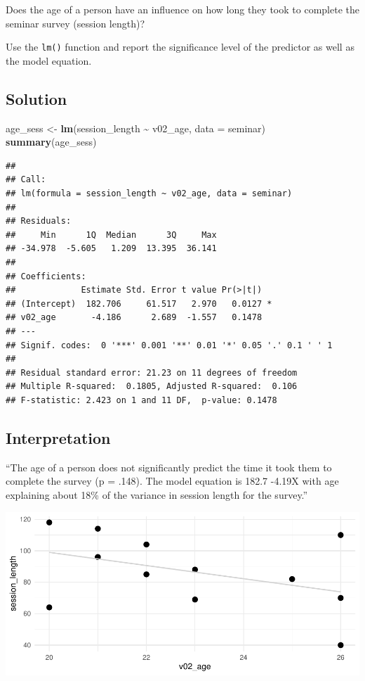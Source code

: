 \documentclass[
]{book}
\newenvironment{Shaded}{\begin{snugshade}}{\end{snugshade}}
\newcommand{\AttributeTok}[1]{\textcolor[rgb]{0.13,0.29,0.53}{#1}}
\newcommand{\FunctionTok}[1]{\textcolor[rgb]{0.13,0.29,0.53}{\textbf{#1}}}
\newcommand{\NormalTok}[1]{#1}
\newcommand{\OtherTok}[1]{\textcolor[rgb]{0.56,0.35,0.01}{#1}}
\newcommand{\SpecialCharTok}[1]{\textcolor[rgb]{0.81,0.36,0.00}{\textbf{#1}}}
\begin{document}
Does the age of a person have an influence on how long they took to complete the seminar survey (session length)?

Use the \texttt{lm()} function and report the significance level of the predictor as well as the model equation.

\subsection{Solution}\label{solution-13}

\begin{Shaded}
\begin{Highlighting}[]
\NormalTok{age\_sess }\OtherTok{\textless{}{-}} \FunctionTok{lm}\NormalTok{(session\_length }\SpecialCharTok{\textasciitilde{}}\NormalTok{ v02\_age, }\AttributeTok{data =}\NormalTok{ seminar)}
\FunctionTok{summary}\NormalTok{(age\_sess)}
\end{Highlighting}
\end{Shaded}

\begin{verbatim}
## 
## Call:
## lm(formula = session_length ~ v02_age, data = seminar)
## 
## Residuals:
##     Min      1Q  Median      3Q     Max 
## -34.978  -5.605   1.209  13.395  36.141 
## 
## Coefficients:
##             Estimate Std. Error t value Pr(>|t|)  
## (Intercept)  182.706     61.517   2.970   0.0127 *
## v02_age       -4.186      2.689  -1.557   0.1478  
## ---
## Signif. codes:  0 '***' 0.001 '**' 0.01 '*' 0.05 '.' 0.1 ' ' 1
## 
## Residual standard error: 21.23 on 11 degrees of freedom
## Multiple R-squared:  0.1805, Adjusted R-squared:  0.106 
## F-statistic: 2.423 on 1 and 11 DF,  p-value: 0.1478
\end{verbatim}

\subsection{Interpretation}\label{interpretation}

``The age of a person does not significantly predict the time it took them to complete the survey (p = .148). The model equation is 182.7 -4.19X with age explaining about 18\% of the variance in session length for the survey.''

\includegraphics{_main_files/figure-latex/unnamed-chunk-79-1.pdf}
\end{document}
